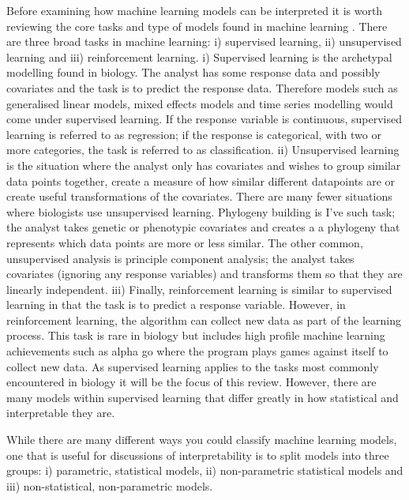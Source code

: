 \documentclass[10pt,]{article}
\begin{document}
Before examining how machine learning models can be interpreted it is worth reviewing the core tasks and type of models found in machine learning \citep{crisci2012review, breiman2001statistical}. There are three broad tasks in machine learning: i) supervised learning, ii) unsupervised learning and iii) reinforcement learning. i) Supervised learning is the archetypal modelling found in biology. The analyst has some response data and possibly covariates and the task is to predict the response data. Therefore models such as generalised linear models, mixed effects models and time series modelling would come under supervised learning. If the response variable is continuous, supervised learning is referred to as regression; if the response is categorical, with two or more categories, the task is referred to as classification. ii) Unsupervised learning is the situation where the analyst only has covariates and wishes to group similar data points together, create a measure of how similar different datapoints are or create useful transformations of the covariates. There are many fewer situations where biologists use unsupervised learning. Phylogeny building is I've such task; the analyst takes genetic or phenotypic covariates and creates a a phylogeny that represents which data points are more or less similar. The other common, unsupervised analysis is principle component analysis; the analyst takes covariates (ignoring any response variables) and transforms them so that they are linearly independent. iii) Finally, reinforcement learning is similar to supervised learning in that the task is to predict a response variable. However, in reinforcement learning, the algorithm can collect new data as part of the learning process. This task is rare in biology but includes high profile machine learning achievements such as alpha go \citep{silver2016mastering} where the program plays games against itself to collect new data. As supervised learning applies to the tasks most commonly encountered in biology it will be the focus of this review. However, there are many models within supervised learning that differ greatly in how statistical and interpretable they are.

While there are many different ways you could classify machine learning models, one that is useful for discussions of interpretability is to split models into three groups: i) parametric, statistical models, ii) non-parametric statistical models and iii) non-statistical, non-parametric models.
\end{document}

